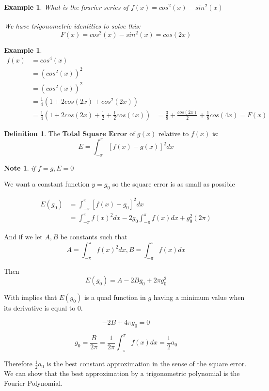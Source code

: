 \documentclass[12pt]{article}
\theoremstyle{plain}
\newtheorem*{note}{Note}
\newtheorem{example}[theorem]{Example}
\theoremstyle{definition}
\newtheorem{definition}[theorem]{Definition}
\begin{document}
\begin{example}
	What is the fourier series of $f(x)=cos^2(x) - sin^2(x)$\\
	\\
	We have trigonometric identities to solve this:
	$$F(x)=cos^2(x) - sin^2(x)=cos(2x)$$
\end{example}

\begin{example}
	\begin{align*}
	f(x) &=cos^4(x)\\
	&=(cos^2(x))^2\\
	&=(cos^2(x))^2\\
	&= \frac{1}{4}(1+2cos(2x) + cos^2 (2x))\\
	&= \frac{1}{4}(1 + 2cos(2x) + \frac{1}{2} + \frac{1}{2}cos(4x))
	&= \frac{3}{8} + \frac{cos(2x)}{2} + \frac{1}{8}cos(4x) = F(x)
	\end{align*}
\end{example}

\begin{definition}
	The \textbf{Total Square Error} of $g(x)$ relative to $f(x)$ is:
	$$E = \int^\pi_{-\pi} [f(x) - g(x)]^2 dx$$
\end{definition}

\begin{note}
	if $f=g, E=0$
\end{note}

We want a constant function $y=g_0$ so the square error is as small as possible

\begin{align*}
	E(g_0) &= \int^\pi_{-\pi} [f(x) - g_0]^2 dx\\
	&= \int^\pi_{-\pi} f(x)^2 dx - 2 g_0 \int^\pi_{-\pi} f(x) dx + g_0^2 (2\pi)
\end{align*}

And if we let $A,B$ be constants such that $$A = \int^\pi_{-\pi} f(x)^2 dx, B = \int^\pi_{-\pi} f(x) dx$$

Then
$$E(g_0) = A - 2 B g_0 + 2 \pi g_0^2$$

With implies that $E(g_0)$ is a quad function in $g$ having a minimum value when its derivative is equal to 0.

$$-2B + 4\pi g_0 = 0$$

$$g_0 = \frac{B}{2\pi} = \frac{1}{2\pi} \int^\pi_{-\pi} f(x) dx = \frac{1}{2} a_0$$

Therefore $\frac{1}{2} a_0$ is the best constant approximation in the sense of the square error. We can show that the best approximation by a trigonometric polynomial is the Fourier Polynomial.
\end{document}
